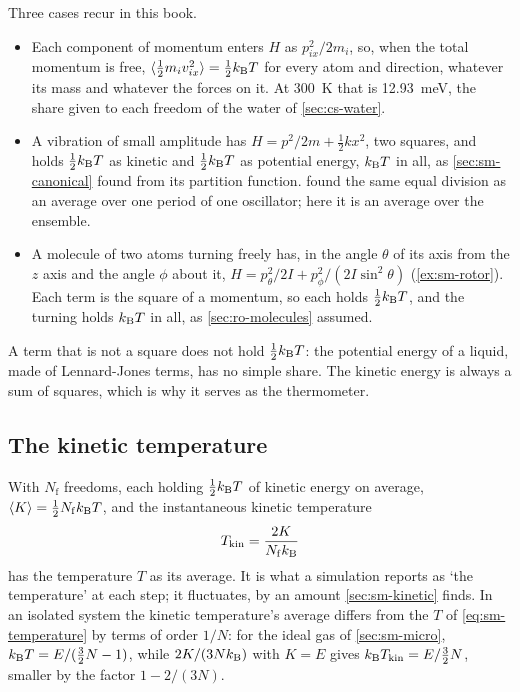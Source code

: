 Three cases recur in this book.
\begin{itemize}
\item Each component of momentum enters $H$ as $p_{ix}^2/2m_i$, so, when
   the total momentum is free, $\langle \frac12m_iv_{ix}^2 \rangle = \frac12k_{\mathrm{B}} T$
   for every atom and direction,
   whatever its mass and whatever the forces on it. At \SI{300}{\kelvin}
   that is \SI{12.93}{\milli\electronvolt}, the share given to each
   freedom of the water of \cref{sec:cs-water}.
\item A vibration of small amplitude has $H = p^2/2m + \frac12kx^2$, two
   squares, and holds $\frac12k_{\mathrm{B}} T$ as kinetic and $\frac12k_{\mathrm{B}} T$ as
   potential energy, $k_{\mathrm{B}} T$ in all, as \cref{sec:sm-canonical} found from
   its partition function.  found the same equal
   division as an average over one period of one oscillator; here it is an
   average over the ensemble.
\item A molecule of two atoms turning freely has, in the angle $\theta$
   of its axis from the $z$ axis and the angle $\phi$ about it, $H = p_\theta^2/2I + p_\phi^2/(2I\sin^2\theta)$
   (\cref{ex:sm-rotor}). Each term is the square of a momentum, so each
   holds $\frac12k_{\mathrm{B}} T$, and the turning holds $k_{\mathrm{B}} T$ in all, as
   \cref{sec:ro-molecules} assumed.
\end{itemize}
A term that is not a square does not hold $\frac12k_{\mathrm{B}} T$: the potential
energy of a liquid, made of Lennard-Jones terms, has no simple share. The
kinetic energy is always a sum of squares, which is why it serves as the
thermometer.

\subsection*{The kinetic temperature}

With $N_{\mathrm f}$ freedoms, each holding $\frac12k_{\mathrm{B}} T$ of kinetic
energy on average, $\langle K \rangle = \frac12N_{\mathrm f}k_{\mathrm{B}} T$, and the
instantaneous kinetic temperature
\begin{equation}
   T_{\mathrm{kin}} = \frac{2K}{N_{\mathrm f}k_{\mathrm{B}}}
   \label{eq:sm-kinetic-temperature}
\end{equation}
has the temperature $T$ as its average. It is what a simulation reports
as `the temperature' at each step; it fluctuates, by an amount
\cref{sec:sm-kinetic} finds. In an isolated system the kinetic
temperature's average differs from the $T$ of \cref{eq:sm-temperature} by
terms of order $1/N$: for the ideal gas of \cref{sec:sm-micro}, $k_{\mathrm{B}} T =
E/(\frac32N - 1)$, while $2K/(3Nk_{\mathrm{B}})$ with $K = E$ gives $k_{\mathrm{B}}
T_{\mathrm{kin}} = E/\frac32N$, smaller by the factor $1 - 2/(3N)$.

